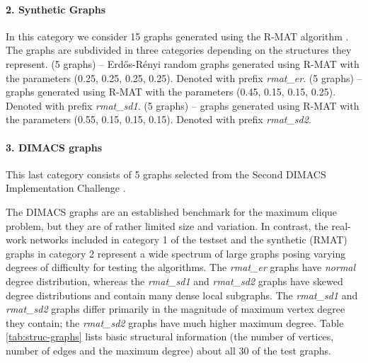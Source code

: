 \paragraph{2. Synthetic Graphs} 
In this category we consider 15 graphs generated using 
the R-MAT algorithm \cite{Chakrabarti:2006:GML:1132952.1132954}. The graphs
are subdivided in three categories depending on the structures they represent.
 (5 graphs) -- Erd\H{o}s-R\'{e}nyi random  graphs generated using R-MAT 
with the parameters (0.25, 0.25, 0.25, 0.25).  Denoted with prefix {\it rmat\_er}.
 (5 graphs) -- graphs generated using R-MAT with the parameters (0.45, 0.15, 0.15, 0.25). Denoted with prefix {\it rmat\_sd1}.
 (5 graphs) --  graphs generated using R-MAT with the parameters (0.55, 0.15, 0.15, 0.15). Denoted with prefix {\it rmat\_sd2}.

\paragraph{3. DIMACS graphs} 
This last category consists of 5 graphs selected from the Second DIMACS Implementation Challenge \cite{dimacs}. 

The DIMACS graphs  are an established benchmark for the maximum
clique problem, but they are of rather limited size and variation. 
In contrast, the real-work networks included  in category 1 of the testset
and the synthetic (RMAT) graphs in category 2
represent a wide spectrum of large graphs posing varying degrees of difficulty for testing the algorithms. 
The {\it rmat\_er} graphs have {\it normal} degree distribution, whereas the {\it rmat\_sd1} and {\it rmat\_sd2} graphs have skewed degree distributions and contain many dense local subgraphs.
 The {\it rmat\_sd1} and {\it rmat\_sd2} graphs differ primarily in the magnitude of maximum vertex degree they contain; the {\it rmat\_sd2} graphs have much higher maximum degree. 
Table \ref{tab:struc-graphs} lists basic structural information (the number of vertices, 
number of edges and the maximum degree) about all 30 of the test graphs.



